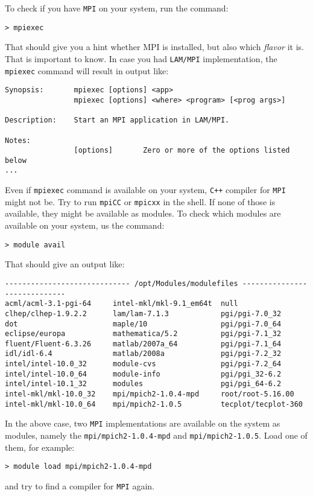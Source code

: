 To check if you have {\tt MPI} on your system, run the command:
%
\begin{verbatim}
> mpiexec
\end{verbatim}
%
That should give you a hint whether MPI is installed, but also which {\em flavor}
it is. That is important to know. In case you had {\tt LAM/MPI} implementation,
the {\tt mpiexec} command will result in output like:
%
{\small \begin{verbatim}
Synopsis:       mpiexec [options] <app>
                mpiexec [options] <where> <program> [<prog args>]

Description:    Start an MPI application in LAM/MPI.

Notes:
                [options]       Zero or more of the options listed below
...
\end{verbatim}}
%
Even if {\tt mpiexec} command is available on your system, {\tt C++} compiler
for {\tt MPI} might not be. Try to run {\tt mpiCC} or {\tt mpicxx} in the shell.
%
If none of those is available, they might be available as modules. To check 
which modules are available on your system, us the command:
%
\begin{verbatim}
> module avail
\end{verbatim}
%
That should give an output like:
%
{\small \begin{verbatim}
----------------------------- /opt/Modules/modulefiles -----------------------------
acml/acml-3.1-pgi-64     intel-mkl/mkl-9.1_em64t  null
clhep/clhep-1.9.2.2      lam/lam-7.1.3            pgi/pgi-7.0_32
dot                      maple/10                 pgi/pgi-7.0_64
eclipse/europa           mathematica/5.2          pgi/pgi-7.1_32
fluent/Fluent-6.3.26     matlab/2007a_64          pgi/pgi-7.1_64
idl/idl-6.4              matlab/2008a             pgi/pgi-7.2_32
intel/intel-10.0_32      module-cvs               pgi/pgi-7.2_64
intel/intel-10.0_64      module-info              pgi/pgi_32-6.2
intel/intel-10.1_32      modules                  pgi/pgi_64-6.2
intel-mkl/mkl-10.0_32    mpi/mpich2-1.0.4-mpd     root/root-5.16.00
intel-mkl/mkl-10.0_64    mpi/mpich2-1.0.5         tecplot/tecplot-360
\end{verbatim}}
%
In the above case, two {\tt MPI} implementations are available on the system as modules,
namely the {\tt mpi/mpich2-1.0.4-mpd} and {\tt mpi/mpich2-1.0.5}. Load one of them,
for example:
%
\begin{verbatim}
> module load mpi/mpich2-1.0.4-mpd
\end{verbatim}
%
and try to find a compiler for {\tt MPI} again. 

